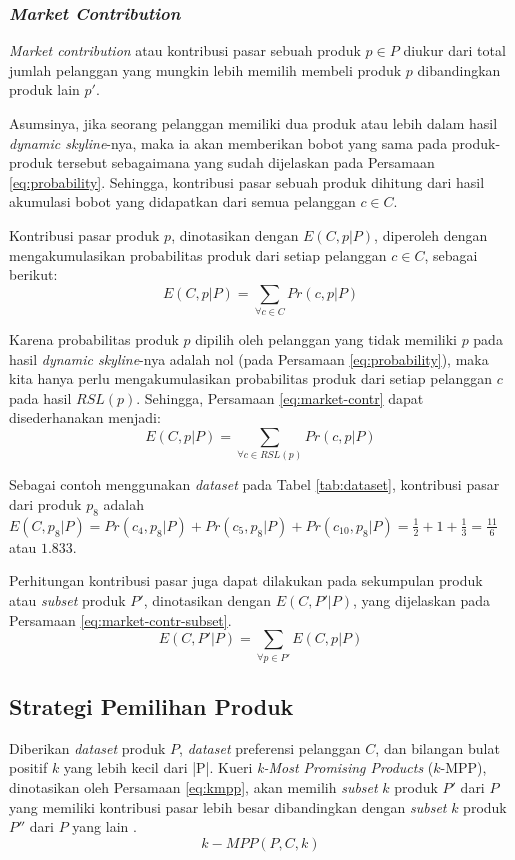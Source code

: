 \subsubsection{\textit{Market Contribution}}
\tab \textit{Market contribution} atau kontribusi pasar sebuah produk $p \in P$ diukur dari total jumlah pelanggan yang mungkin lebih memilih membeli produk $p$ dibandingkan produk lain $p'$.

Asumsinya, jika seorang pelanggan memiliki dua produk atau lebih dalam hasil \textit{dynamic skyline}-nya, maka ia akan memberikan bobot yang sama pada produk-produk tersebut sebagaimana yang sudah dijelaskan pada Persamaan \ref{eq:probability}. Sehingga, kontribusi pasar sebuah produk dihitung dari hasil akumulasi bobot yang didapatkan dari semua pelanggan $c \in C$.

Kontribusi pasar produk $p$, dinotasikan dengan $E(C, p|P)$, diperoleh dengan mengakumulasikan probabilitas produk dari setiap pelanggan $c \in C$, sebagai berikut:\\
\begin{equation}\label{eq:market-contr}
E(C, p|P) = \sum_{\forall c \in C} Pr(c, p|P)
\end{equation}

Karena probabilitas produk $p$ dipilih oleh pelanggan yang tidak memiliki $p$ pada hasil \textit{dynamic skyline}-nya adalah nol (pada Persamaan \ref{eq:probability}), maka kita hanya perlu mengakumulasikan probabilitas produk dari setiap pelanggan $c$ pada hasil $RSL(p)$. Sehingga, Persamaan \ref{eq:market-contr} dapat disederhanakan menjadi:
\begin{equation}\label{eq:market-contr-rsl}
E(C, p|P) = \sum_{\forall c \in RSL(p)} Pr(c, p|P)
\end{equation}

\pagebreak
Sebagai contoh menggunakan \textit{dataset} pada Tabel \ref{tab:dataset}, kontribusi pasar dari produk $p_8$ adalah $E(C, p_8|P) = Pr(c_4, p_8|P) + Pr(c_5, p_8|P) + Pr(c_{10}, p_8|P) = \frac{1}{2} + 1 + \frac{1}{3} = \frac{11}{6}$ atau $1.833$.

Perhitungan kontribusi pasar juga dapat dilakukan pada sekumpulan produk atau \textit{subset} produk $P'$, dinotasikan dengan $E(C, P'|P)$, yang dijelaskan pada Persamaan \ref{eq:market-contr-subset}.
\begin{equation}\label{eq:market-contr-subset}
E(C, P'|P) = \sum_{\forall p \in P'} E(C, p|P)
\end{equation}

\subsection{Strategi Pemilihan Produk}
\tab Diberikan \textit{dataset} produk $P$, \textit{dataset} preferensi pelanggan $C$, dan bilangan bulat positif $k$ yang lebih kecil dari |P|. Kueri \textit{k-Most Promising Products} ($k$-MPP), dinotasikan oleh Persamaan \ref{eq:kmpp}, akan memilih \textit{subset} $k$ produk $P'$ dari $P$ yang memiliki kontribusi pasar lebih besar dibandingkan dengan \textit{subset} $k$ produk $P''$ dari $P$ yang lain \cite{kmpp}.
\begin{equation}\label{eq:kmpp}
k-MPP(P, C, k)
\end{equation}

